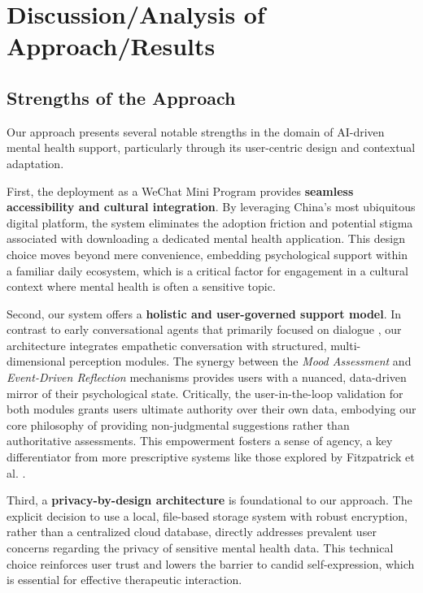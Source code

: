\section{Discussion/Analysis of Approach/Results}
\label{sec:discussion}

\subsection{Strengths of the Approach}

Our approach presents several notable strengths in the domain of AI-driven mental health support, particularly through its user-centric design and contextual adaptation.

First, the deployment as a WeChat Mini Program provides \textbf{seamless accessibility and cultural integration}. By leveraging China's most ubiquitous digital platform, the system eliminates the adoption friction and potential stigma associated with downloading a dedicated mental health application. This design choice moves beyond mere convenience, embedding psychological support within a familiar daily ecosystem, which is a critical factor for engagement in a cultural context where mental health is often a sensitive topic.

Second, our system offers a \textbf{holistic and user-governed support model}. In contrast to early conversational agents that primarily focused on dialogue \cite{weizenbaum1966eliza}, our architecture integrates empathetic conversation with structured, multi-dimensional perception modules. The synergy between the \textit{Mood Assessment} and \textit{Event-Driven Reflection} mechanisms provides users with a nuanced, data-driven mirror of their psychological state. Critically, the user-in-the-loop validation for both modules grants users ultimate authority over their own data, embodying our core philosophy of providing non-judgmental suggestions rather than authoritative assessments. This empowerment fosters a sense of agency, a key differentiator from more prescriptive systems like those explored by Fitzpatrick et al. \cite{fitzpatrick2017delivering}.

Third, a \textbf{privacy-by-design architecture} is foundational to our approach. The explicit decision to use a local, file-based storage system with robust encryption, rather than a centralized cloud database, directly addresses prevalent user concerns regarding the privacy of sensitive mental health data. This technical choice reinforces user trust and lowers the barrier to candid self-expression, which is essential for effective therapeutic interaction.

